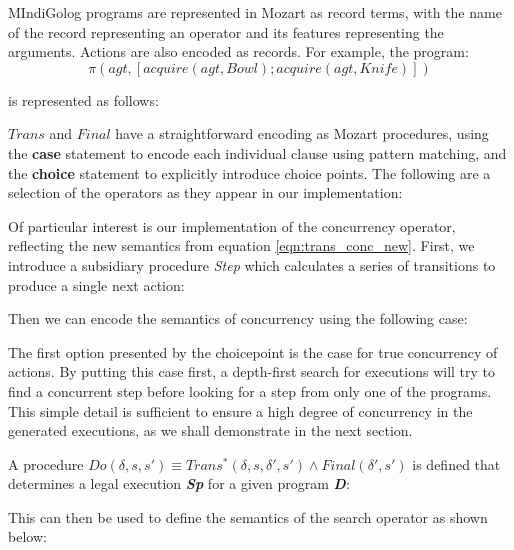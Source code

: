 MIndiGolog programs are represented in Mozart as record terms, with
the name of the record representing an operator and its features representing
the arguments. Actions are also encoded as records. For example, the
program:\[
\pi(agt,\left[acquire(agt,Bowl);acquire(agt,Knife)\right])\]


is represented as follows:


$Trans$ and $Final$ have a straightforward encoding as Mozart procedures,
using the \textbf{case} statement to encode each individual clause
using pattern matching, and the \textbf{choice} statement to explicitly
introduce choice points. The following are a selection of the operators
as they appear in our implementation:



Of particular interest is our implementation of the concurrency operator,
reflecting the new semantics from equation \eqref{eqn:trans_conc_new}.
First, we introduce a subsidiary procedure \emph{Step} which calculates
a series of transitions to produce a single next action:


Then we can encode the semantics of concurrency using the following
case:


The first option presented by the choicepoint is the case for true
concurrency of actions. By putting this case first, a depth-first
search for executions will try to find a concurrent step before looking
for a step from only one of the programs. This simple detail is sufficient
to ensure a high degree of concurrency in the generated executions,
as we shall demonstrate in the next section.

A procedure $Do(\delta,s,s')\equiv Trans^{*}(\delta,s,\delta',s')\wedge Final(\delta',s')$
is defined that determines a legal execution \textbf{\emph{Sp}} for
a given program \textbf{\emph{D}}:


This can then be used to define the semantics of the search operator
as shown below:


